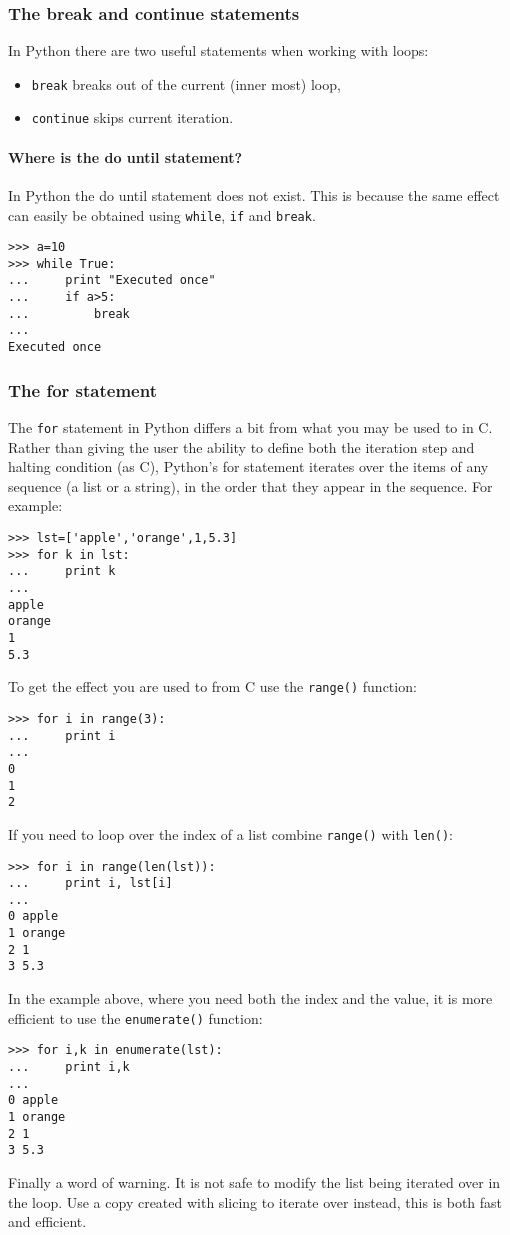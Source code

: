 \documentclass[10pt,a4paper]{article}
\begin{document}
\subsubsection{The break and continue statements}
In Python there are two useful statements when working with loops:
\begin{itemize}
\item \verb|break| breaks out of the current (inner most) loop,
\item \verb|continue| skips current iteration.
\end{itemize}
\paragraph{Where is the do until statement?}
In Python the do until statement does not exist.
This is because the same effect can easily be obtained using \verb|while|, \verb|if| and \verb|break|.
\begin{lstlisting}
>>> a=10
>>> while True:
...     print "Executed once"
...     if a>5:
...         break
... 
Executed once
\end{lstlisting}
\subsubsection{The for statement}
The \verb|for| statement in Python differs a bit from what you may be used to in C. Rather than giving the user the ability to define both the iteration step and halting condition (as C), Python's for statement iterates over the items of any sequence (a list or a string), in the order that they appear in the sequence. For example:
\begin{lstlisting}
>>> lst=['apple','orange',1,5.3]
>>> for k in lst:
...     print k
... 
apple
orange
1
5.3
\end{lstlisting}
To get the effect you are used to from C use the \verb|range()| function:
\begin{lstlisting}
>>> for i in range(3):
...     print i
... 
0
1
2
\end{lstlisting}
If you need to loop over the index of a list combine \verb|range()| with \verb|len()|:
\begin{lstlisting}
>>> for i in range(len(lst)):
...     print i, lst[i]
... 
0 apple
1 orange
2 1
3 5.3
\end{lstlisting}
In the example above, where you need both the index and the value, it is more efficient to use the \verb|enumerate()| function:
\begin{lstlisting}
>>> for i,k in enumerate(lst):
...     print i,k
... 
0 apple
1 orange
2 1
3 5.3
\end{lstlisting}
Finally a word of warning.
It is not safe to modify the list being iterated over in the loop.
Use a copy created with slicing to iterate over instead, this is both fast and efficient.
\end{document}
